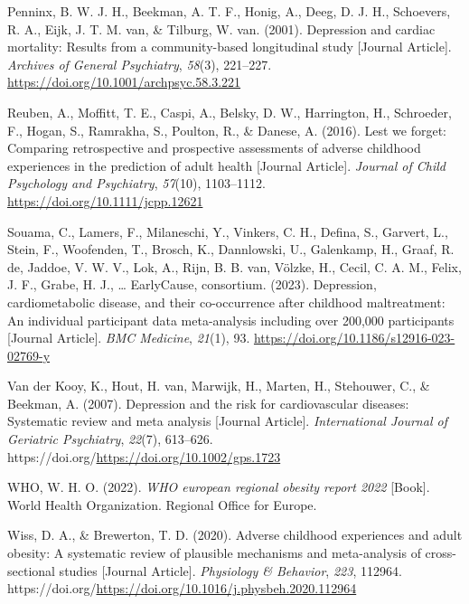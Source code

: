 \documentclass[
  letterpaper,
  DIV=11,
  numbers=noendperiod]{scrreport}
\newlength{\cslhangindent}
\newenvironment{CSLReferences}[2] %
 {\begin{list}{}{%
  \setlength{\itemindent}{0pt}
  \setlength{\leftmargin}{0pt}
  \setlength{\parsep}{0pt}
  \ifodd #1
   \setlength{\leftmargin}{\cslhangindent}
   \setlength{\itemindent}{-1\cslhangindent}
  \fi
  \setlength{\itemsep}{#2\baselineskip}}}
 {\end{list}}
\begin{document}
\begin{CSLReferences}{1}{0}
Penninx, B. W. J. H., Beekman, A. T. F., Honig, A., Deeg, D. J. H.,
Schoevers, R. A., Eijk, J. T. M. van, \& Tilburg, W. van. (2001).
Depression and cardiac mortality: Results from a community-based
longitudinal study {[}Journal Article{]}. \emph{Archives of General
Psychiatry}, \emph{58}(3), 221--227.
\url{https://doi.org/10.1001/archpsyc.58.3.221}

Reuben, A., Moffitt, T. E., Caspi, A., Belsky, D. W., Harrington, H.,
Schroeder, F., Hogan, S., Ramrakha, S., Poulton, R., \& Danese, A.
(2016). Lest we forget: Comparing retrospective and prospective
assessments of adverse childhood experiences in the prediction of adult
health {[}Journal Article{]}. \emph{Journal of Child Psychology and
Psychiatry}, \emph{57}(10), 1103--1112.
\url{https://doi.org/10.1111/jcpp.12621}

Souama, C., Lamers, F., Milaneschi, Y., Vinkers, C. H., Defina, S.,
Garvert, L., Stein, F., Woofenden, T., Brosch, K., Dannlowski, U.,
Galenkamp, H., Graaf, R. de, Jaddoe, V. W. V., Lok, A., Rijn, B. B. van,
Völzke, H., Cecil, C. A. M., Felix, J. F., Grabe, H. J., \ldots{}
EarlyCause, consortium. (2023). Depression, cardiometabolic disease, and
their co-occurrence after childhood maltreatment: An individual
participant data meta-analysis including over 200,000 participants
{[}Journal Article{]}. \emph{BMC Medicine}, \emph{21}(1), 93.
\url{https://doi.org/10.1186/s12916-023-02769-y}

Van der Kooy, K., Hout, H. van, Marwijk, H., Marten, H., Stehouwer, C.,
\& Beekman, A. (2007). Depression and the risk for cardiovascular
diseases: Systematic review and meta analysis {[}Journal Article{]}.
\emph{International Journal of Geriatric Psychiatry}, \emph{22}(7),
613--626. https://doi.org/\url{https://doi.org/10.1002/gps.1723}

WHO, W. H. O. (2022). \emph{WHO european regional obesity report 2022}
{[}Book{]}. World Health Organization. Regional Office for Europe.

Wiss, D. A., \& Brewerton, T. D. (2020). Adverse childhood experiences
and adult obesity: A systematic review of plausible mechanisms and
meta-analysis of cross-sectional studies {[}Journal Article{]}.
\emph{Physiology \& Behavior}, \emph{223}, 112964.
https://doi.org/\url{https://doi.org/10.1016/j.physbeh.2020.112964}


\end{CSLReferences}
\end{document}
